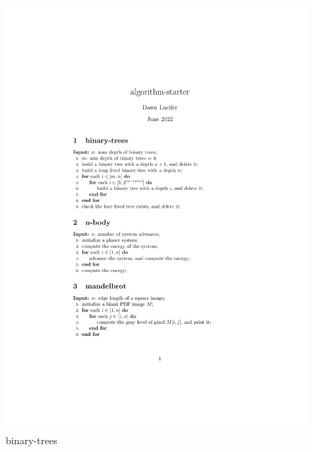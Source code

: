 \begin{figure}[htbp]
    \centerline{\includegraphics[scale=0.8]{figures/binary-trees}}
    \caption{binary-trees}
    \label{fig:binary-trees}
\end{figure}


